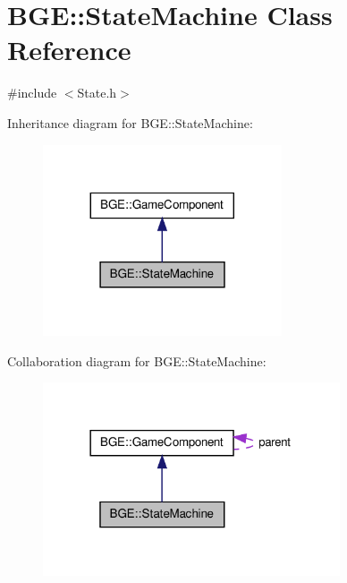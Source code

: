 \hypertarget{class_b_g_e_1_1_state_machine}{\section{B\-G\-E\-:\-:State\-Machine Class Reference}
\label{class_b_g_e_1_1_state_machine}
}


{\ttfamily \#include $<$State.\-h$>$}



Inheritance diagram for B\-G\-E\-:\-:State\-Machine\-:
\nopagebreak
\begin{figure}[H]
\begin{center}
\leavevmode
\includegraphics[width=200pt]{class_b_g_e_1_1_state_machine__inherit__graph}
\end{center}
\end{figure}


Collaboration diagram for B\-G\-E\-:\-:State\-Machine\-:
\nopagebreak
\begin{figure}[H]
\begin{center}
\leavevmode
\includegraphics[width=249pt]{class_b_g_e_1_1_state_machine__coll__graph}
\end{center}
\end{figure}
